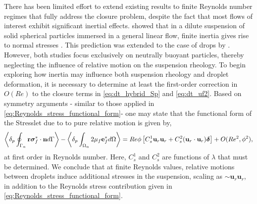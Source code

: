 There has been limited effort to extend existing results to finite Reynolds number regimes that fully address the closure problem, despite the fact that most flows of interest exhibit significant inertial effects. 
\citet{stone2001inertial} showed that in a dilute suspension of solid spherical particles immersed in a general linear flow, finite inertia gives rise to normal stresses . %
This prediction was extended to the case of drops by \citet{raja2010inertial}. 
However, both studies focus exclusively on neutrally buoyant particles, thereby neglecting the influence of relative motion on the suspension rheology.
To begin exploring how inertia may influence both suspension rheology and droplet deformation, it is necessary to determine at least the first-order correction in $O(Re)$ to the closure terms in \ref{eq:dt_hybrid_Sp} and \ref{eq:dt_uf2}. 
Based on symmetry arguments - similar to those applied in  \ref{eq:Reynolds_stress_functional_form}- one may state that the functional form of the Stresslet due to to pure relative motion is given by, 
\begin{equation}
    \pSavg{\textbf{r}\bm\sigma^*_f\cdot \textbf{n}}
    -\pOavg{2\mu_f\textbf{e}^*_f}
    =
    Re \phi 
    \left[
       C_s^1 \textbf{u}_{r}\textbf{u}_{r} 
    +  C_s^2 (\textbf{u}_{r}\cdot \textbf{u}_{r})\bm\delta
    \right]
    + O(Re^2,\phi^2),
    \label{eq:final}
\end{equation}
at first order in Reynolds number. 
Here, $C_s^1$ and $C_s^2$ are functions of $\lambda$ that must be determined.
We conclude that at finite Reynolds values, relative motions between droplets induce additional stresses in the suspension, scaling as $\sim \textbf{u}_r\textbf{u}_r$, in addition to the Reynolds stress contribution given in \eqref{eq:Reynolds_stress_functional_form}. 

